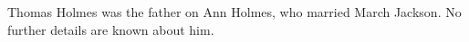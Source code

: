 
Thomas Holmes was the father on Ann Holmes, who married March Jackson.  No further details are known about him.
